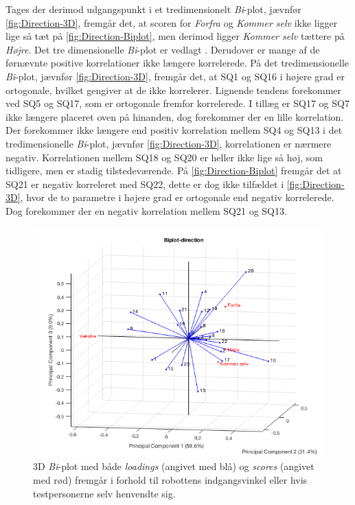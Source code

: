 \noindent
%
Tages der derimod udgangspunkt i et tredimensionelt \textit{Bi}-plot, jævnfør \autoref{fig:Direction-3D}, fremgår det, at scoren for \textit{Forfra} og \textit{Kommer selv} ikke ligger lige så tæt på \autoref{fig:Direction-Biplot}, men derimod ligger \textit{Kommer selv} tættere på \textit{Højre}. Det tre dimensionelle \textit{Bi}-plot er vedlagt . Derudover er mange af de førnævnte positive korrelationer ikke længere korrelerede. På det tredimensionelle \textit{Bi}-plot, jævnfør \autoref{fig:Direction-3D}, fremgår det, at SQ1 og SQ16 i højere grad er ortogonale, hvilket gengiver at de ikke korrelerer. Lignende tendens forekommer ved SQ5 og SQ17, som er ortogonale fremfor korrelerede. I tillæg er SQ17 og SQ7 ikke længere placeret oven på hinanden, dog forekommer der en lille korrelation. Der forekommer ikke længere end positiv korrelation mellem SQ4 og SQ13 i det tredimensionelle \textit{Bi}-plot, jævnfør \autoref{fig:Direction-3D}, korrelationen er nærmere negativ. Korrelationen mellem SQ18 og SQ20 er heller ikke lige så høj, som tidligere, men er stadig tilstedeværende. På \autoref{fig:Direction-Biplot} fremgår det at SQ21 er negativ korreleret med SQ22, dette er dog ikke tilfældet i \autoref{fig:Direction-3D}, hvor de to parametre i højere grad er ortogonale end negativ korrelerede. Dog forekommer der en negativ korrelation mellem SQ21 og SQ13.
%
\begin{figure}[H]
\centering
\includegraphics[width=\textwidth]{Figure/DatabehandlingSkalaer/PCAfigures/Direction-3D.png}
\caption{3D \textit{Bi}-plot med både \textit{loadings} (angivet med blå) og \textit{scores} (angivet med rød) fremgår i forhold til robottens indgangsvinkel eller hvis testpersonerne selv henvendte sig.}
\label{fig:Direction-3D}
\end{figure}
%


